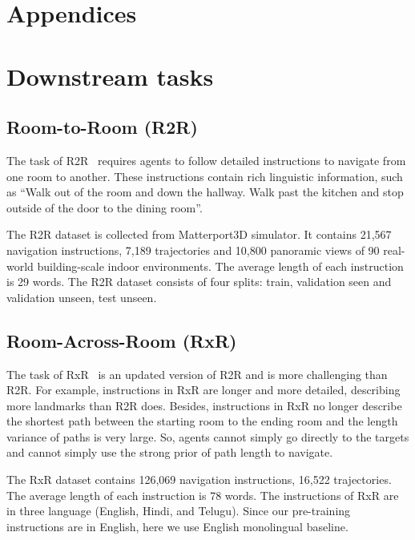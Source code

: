 \documentclass[10pt,twocolumn,letterpaper]{article}
\begin{document}
{\small


}

\clearpage

\appendix
\section*{Appendices}
\section{Downstream tasks}
\subsection{Room-to-Room (R2R)}
The task of R2R~\cite{r2r} requires agents to follow detailed instructions to navigate from one room to another. These instructions contain rich linguistic information, such as ``Walk out of the room and down the hallway. Walk past the kitchen and stop outside of the door to the dining room''.
\vspace{0pt}

The R2R dataset is collected from Matterport3D simulator. It contains 21,567 navigation instructions, 7,189 trajectories and 10,800 panoramic views of 90 real-world building-scale indoor environments. The average length of each instruction is 29 words. The R2R dataset consists of four splits: train, validation seen and validation unseen, test unseen. 

\vspace{0pt}
\subsection{Room-Across-Room (RxR)}
The task of RxR~\cite{rxr} is an updated version of R2R and is more challenging than R2R. For example, instructions in RxR are longer and more detailed, describing more landmarks than R2R does. Besides, instructions in RxR no longer describe the shortest path between the starting room to the ending room and the length variance of paths is very large. So, agents cannot simply go directly to the targets and cannot simply use the strong prior of path length to navigate.

\vspace{0pt}
The RxR dataset contains 126,069 navigation instructions, 16,522 trajectories. The average length of each instruction is 78 words.
The instructions of RxR are in three language (\ie English, Hindi, and Telugu). Since our pre-training instructions are in English, here we use English monolingual baseline.
\end{document}
